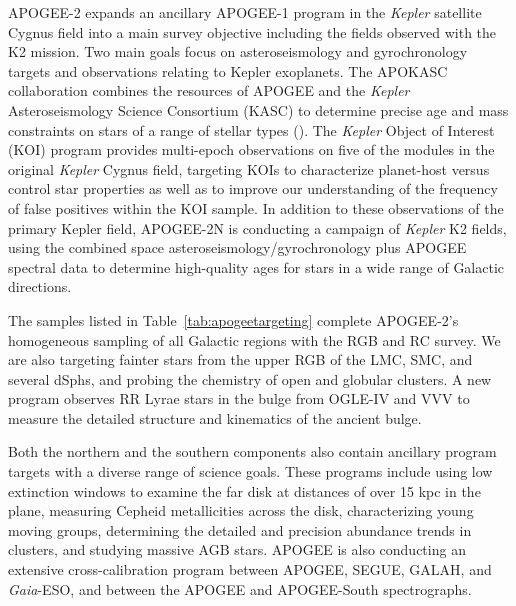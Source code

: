 APOGEE-2 expands an ancillary APOGEE-1 program in the {\it Kepler}
satellite Cygnus field into a main survey objective including the
fields observed with the K2 mission.  Two main goals focus on
asteroseismology and gyrochronology targets and observations relating to
Kepler exoplanets. The APOKASC collaboration combines the resources of
APOGEE and the {\it Kepler} Asteroseismology Science Consortium (KASC)
to determine precise age and mass constraints on stars of a range of
stellar types (\citealt{pinsonneault14a}).  The {\it Kepler} Object of
Interest (KOI) program provides multi-epoch observations on five of
the modules in the original {\it Kepler} Cygnus field, targeting KOIs
to characterize planet-host versus control star properties as well as
to improve our understanding of the frequency of false positives
within the KOI sample.  In addition to these observations of the
primary Kepler field, APOGEE-2N is conducting a campaign of {\it
  Kepler} K2 fields, using the combined space
asteroseismology/gyrochronology plus APOGEE spectral data to determine
high-quality ages for stars in a wide range of Galactic directions.

The samples listed in Table~\ref{tab:apogeetargeting} complete
APOGEE-2's homogeneous sampling of all Galactic regions with the RGB
and RC survey. We are also targeting fainter stars from the upper RGB of
the LMC, SMC, and several dSphs, and probing the chemistry of open and
globular clusters. A new program observes RR Lyrae stars in the
bulge from OGLE-IV and VVV to measure the detailed structure and
kinematics of the ancient bulge.

Both the northern and the southern components also contain ancillary
program targets with a diverse range of science goals. These programs
include using low extinction windows to examine the far disk at
distances of over 15 kpc in the plane, measuring Cepheid metallicities
across the disk, characterizing young moving groups, determining the
detailed and precision abundance trends in clusters, and studying
massive AGB stars. APOGEE is also conducting an extensive
cross-calibration program between APOGEE, SEGUE, GALAH, and {\it
  Gaia}-ESO, and between the APOGEE and APOGEE-South spectrographs.

